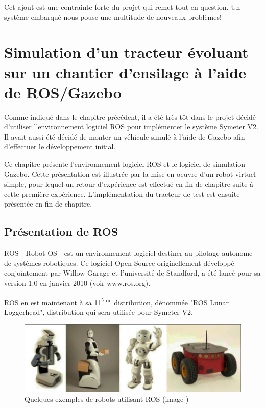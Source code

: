\documentclass[12pt,a4paper]{report}
\begin{document}
	\para Cet ajout est une contrainte forte du projet qui remet tout en question. Un système embarqué nous pouse une multitude de nouveaux problèmes!
				

\chapter{Simulation d'un tracteur évoluant sur un chantier d'ensilage à l'aide de ROS/Gazebo}
\label{chap-simu-ros-gazebo}

Comme indiqué dans le chapitre précédent, il a été très tôt dans le projet décidé d'utiliser l'environnement logiciel ROS pour implémenter le système Symeter V2. Il avait aussi été décidé de monter un véhicule simulé à l'aide de Gazebo afin d'effectuer le développement initial.

\para Ce chapitre présente l'environnement logiciel ROS et le logiciel de simulation Gazebo. Cette présentation est illustrée par la mise en oeuvre d'un robot virtuel simple, pour lequel un retour d'expérience est effectué en fin de chapitre suite à cette première expérience. L'implémentation du tracteur de test est ensuite présentée en fin de chapitre.

	\section{Présentation de ROS}
	
	ROS - Robot OS - est un environnement logiciel destiner au pilotage autonome de systèmes robotiques. Ce logiciel Open Source originellement développé conjointement par Willow Garage et l'université de Standford, a été lancé pour sa version 1.0 en janvier 2010 (voir www.ros.org).
	
	\para ROS en est maintenant à sa 11\textsuperscript{ème} distribution, dénommée "ROS Lunar Loggerhead", distribution qui sera utilisée pour Symeter V2.
	
	\begin{figure}[h!]
		\centering
		\includegraphics[width=0.7\linewidth]{img/robotsros}
		\caption[robotsros]{Quelques exemples de robots utilisant ROS (image \cite{martinez_learning_2013})}
		\label{fig:robotsros}
	\end{figure}
	
\end{document}
